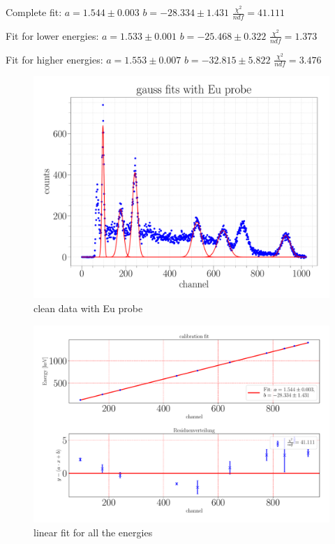 \documentclass[a4paper,12pt]{article}
\begin{document}
Complete fit: \newline
$a = 1.544\pm0.003$ \newline
$b = -28.334\pm1.431$ \newline
$\frac{\chi^2}{ndf} = 41.111$ \newline

Fit for lower energies: \newline
$a = 1.533\pm0.001$ \newline
$b = -25.468\pm0.322$ \newline
$\frac{\chi^2}{ndf} = 1.373$ \newline

Fit for higher energies: \newline
$a = 1.553\pm0.007$ \newline
$b = -32.815\pm5.822$ \newline
$\frac{\chi^2}{ndf} = 3.476$ \newline

\begin{figure}
\center
\includegraphics[scale=0.3]{../Figures/Eu_gauss.pdf}
\caption{clean data with Eu probe}
\label{Eu_gauss}
\end{figure}

\begin{figure}
\center
\includegraphics[scale=0.3]{../Figures/calibration fit.pdf}
\caption{linear fit for all the energies}
\label{calibFit}
\end{figure}
\end{document}
